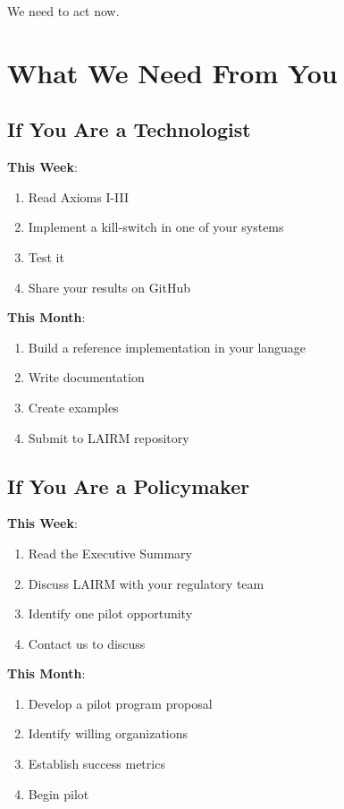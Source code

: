 \documentclass[12pt,a4paper,twoside,openright]{book}
\begin{document}
We need to act now.

\section{What We Need From You}

\subsection{If You Are a Technologist}

\textbf{This Week}:
\begin{enumerate}
    \item Read Axioms I-III
    \item Implement a kill-switch in one of your systems
    \item Test it
    \item Share your results on GitHub
\end{enumerate}

\textbf{This Month}:
\begin{enumerate}
    \item Build a reference implementation in your language
    \item Write documentation
    \item Create examples
    \item Submit to LAIRM repository
\end{enumerate}

\subsection{If You Are a Policymaker}

\textbf{This Week}:
\begin{enumerate}
    \item Read the Executive Summary
    \item Discuss LAIRM with your regulatory team
    \item Identify one pilot opportunity
    \item Contact us to discuss
\end{enumerate}

\textbf{This Month}:
\begin{enumerate}
    \item Develop a pilot program proposal
    \item Identify willing organizations
    \item Establish success metrics
    \item Begin pilot
\end{enumerate}
\end{document}
